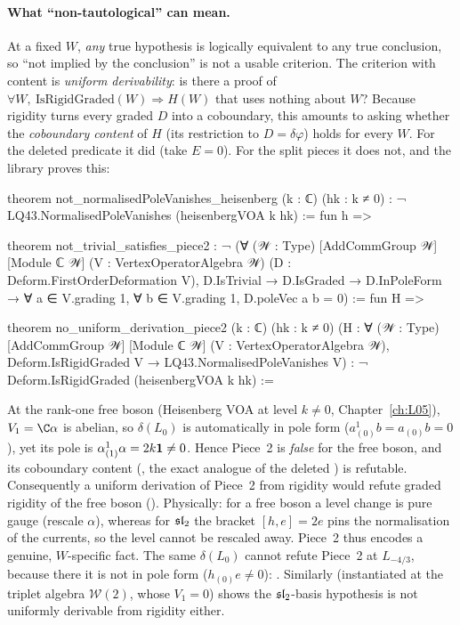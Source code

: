 \paragraph{What ``non-tautological'' can mean.} At a fixed $W$, \emph{any} true hypothesis is
logically equivalent to any true conclusion, so ``not implied by the conclusion'' is not a usable
criterion. The criterion with content is \emph{uniform derivability}: is there a proof of
$\forall W,\ \mathrm{IsRigidGraded}(W)\Rightarrow H(W)$ that uses nothing about $W$? Because rigidity
turns every graded $D$ into a coboundary, this amounts to asking whether the \emph{coboundary
content} of $H$ (its restriction to $D = \delta\varphi$) holds for every $W$. For the deleted predicate
it did (take $E=0$). For the split pieces it does not, and the library proves this:

\begin{leancode}
theorem not_normalisedPoleVanishes_heisenberg (k : ℂ) (hk : k ≠ 0) :
    ¬ LQ43.NormalisedPoleVanishes (heisenbergVOA k hk) := fun h =>
\end{leancode}
\begin{leancode}
theorem not_trivial_satisfies_piece2 :
    ¬ (∀ (𝒲 : Type) [AddCommGroup 𝒲] [Module ℂ 𝒲] (V : VertexOperatorAlgebra 𝒲)
        (D : Deform.FirstOrderDeformation V), D.IsTrivial → D.IsGraded → D.InPoleForm →
        ∀ a ∈ V.grading 1, ∀ b ∈ V.grading 1, D.poleVec a b = 0) := fun H =>
\end{leancode}
\begin{leancode}
theorem no_uniform_derivation_piece2 (k : ℂ) (hk : k ≠ 0)
    (H : ∀ (𝒲 : Type) [AddCommGroup 𝒲] [Module ℂ 𝒲] (V : VertexOperatorAlgebra 𝒲),
      Deform.IsRigidGraded V → LQ43.NormalisedPoleVanishes V) :
    ¬ Deform.IsRigidGraded (heisenbergVOA k hk) :=
\end{leancode}

\begin{dictionary}
At the rank-one free boson (Heisenberg VOA at level $k\neq0$, Chapter~\ref{ch:L05}), $V_1 = \C\alpha$ is
abelian, so $\delta(L_0)$ is automatically in pole form ($a^1_{(0)}b = a_{(0)}b = 0$), yet its pole is
$\alpha^1_{(1)}\alpha = 2k\mathbf{1}\ne0$. Hence Piece~2 is \emph{false} for the free boson, and its
coboundary content (, the exact analogue of the deleted
) is refutable. Consequently a uniform derivation of Piece~2 from rigidity
would refute graded rigidity of the free boson (). Physically:
for a free boson a level change is pure gauge (rescale $\alpha$), whereas for $\mathfrak{sl}_2$ the bracket
$[h,e]=2e$ pins the normalisation of the currents, so the level cannot be rescaled away. Piece~2
thus encodes a genuine, $W$-specific fact. The same $\delta(L_0)$ cannot refute Piece~2 at
$L_{-4/3}$, because there it is not in pole form ($h_{(0)}e\neq0$):
. Similarly 
(instantiated at the triplet algebra $\mathcal{W}(2)$, whose $V_1=0$) shows the $\mathfrak{sl}_2$-basis
hypothesis is not uniformly derivable from rigidity either.
\end{dictionary}


